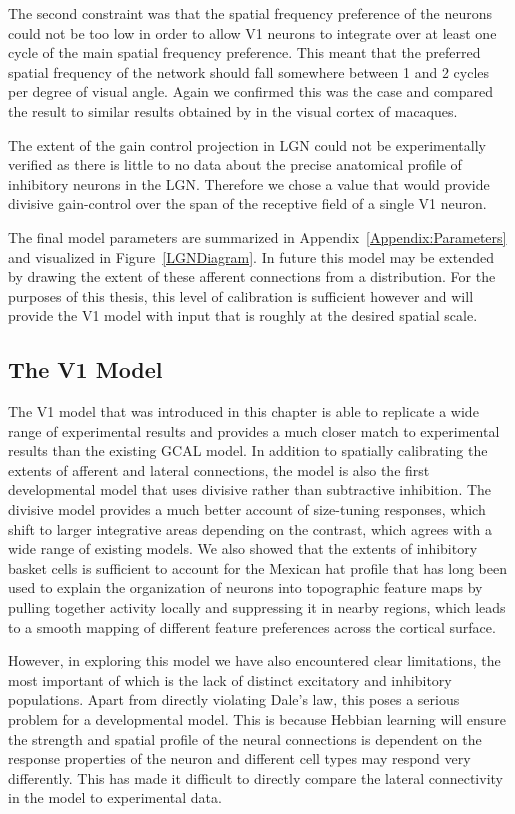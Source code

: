 The second constraint was that the spatial frequency preference of the
neurons could not be too low in order to allow V1 neurons to integrate
over at least one cycle of the main spatial frequency preference. This
meant that the preferred spatial frequency of the network should fall
somewhere between 1 and 2 cycles per degree of visual angle. Again we
confirmed this was the case and compared the result to similar results
obtained by \cite{Levitt2001} in the visual cortex of macaques.

The extent of the gain control projection in LGN could not be
experimentally verified as there is little to no data about the
precise anatomical profile of inhibitory neurons in the LGN. Therefore
we chose a value that would provide divisive gain-control over the
span of the receptive field of a single V1 neuron.

The final model parameters are summarized in
Appendix~\ref{Appendix:Parameters} and visualized in
Figure~\ref{LGNDiagram}. In future this model may be extended by
drawing the extent of these afferent connections from a
distribution. For the purposes of this thesis, this level of
calibration is sufficient however and will provide the V1 model with
input that is roughly at the desired spatial scale.

\subsection{The V1 Model}

The V1 model that was introduced in this chapter is able to replicate
a wide range of experimental results and provides a much closer match
to experimental results than the existing GCAL model. In addition to
spatially calibrating the extents of afferent and lateral connections,
the model is also the first developmental model that uses divisive
rather than subtractive inhibition. The divisive model provides a much
better account of size-tuning responses, which shift to larger
integrative areas depending on the contrast, which agrees with a wide
range of existing models. We also showed that the extents of
inhibitory basket cells is sufficient to account for the Mexican hat
profile that has long been used to explain the organization of neurons
into topographic feature maps by pulling together activity locally and
suppressing it in nearby regions, which leads to a smooth mapping of
different feature preferences across the cortical surface.

However, in exploring this model we have also encountered clear
limitations, the most important of which is the lack of distinct
excitatory and inhibitory populations. Apart from directly violating
Dale's law, this poses a serious problem for a developmental model.
This is because Hebbian learning will ensure the strength and spatial
profile of the neural connections is dependent on the response
properties of the neuron and different cell types may respond very
differently. This has made it difficult to directly compare the
lateral connectivity in the model to experimental data.

